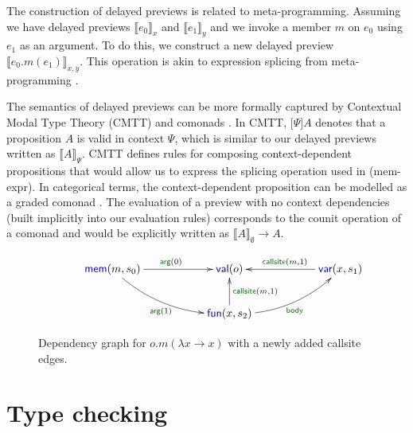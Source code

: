 \documentclass[english,crc]{programming}
\theoremstyle{plain}
\theoremstyle{definition}
\newcommand{\bnd}[1]{\textnormal{\textcolor{kvdclr}{\sffamily #1}}}
\newcommand{\blbl}[1]{\textnormal{\textcolor{numclr}{\sffamily #1}}}
\newcommand{\rname}[1]{{\sffamily(#1)}}
\begin{document}
The construction of delayed previews is related to meta-programming. Assuming
we have delayed previews $\llbracket e_0 \rrbracket_x$ and $\llbracket e_1 \rrbracket_y$ and
we invoke a member $m$ on $e_0$ using $e_1$ as an argument. To do this, we construct a new
delayed preview $\llbracket e_0.m(e_1) \rrbracket_{x, y}$. This operation is akin to expression
splicing from meta-programming \cite{metaml,quotations}.

The semantics of delayed previews can be more formally captured by Contextual Modal Type Theory
(CMTT) \cite{cmtt} and comonads \cite{cmtt-denotation}. In CMTT, $\lbrack \Psi \rbrack A$ denotes
that a proposition $A$ is valid in context $\Psi$, which is similar to our delayed previews written
as $\llbracket A \rrbracket_\Psi$. CMTT defines rules for composing context-dependent propositions
that would allow us to express the splicing operation used in \rname{mem-expr}. In categorical
terms, the context-dependent proposition can be modelled as a graded comonad \cite{effectrev,graded}.
The evaluation of a preview with no context dependencies (built implicitly into our evaluation rules)
corresponds to the counit operation of a comonad and would be explicitly written as
$\llbracket A \rrbracket_\emptyset \rightarrow A$.


\begin{figure}
\vspace{-0.5em}
\begin{equation*}
\hspace{3em}
\xymatrix{
\bnd{mem}(m, s_0) \ar@/_1pc/[drr]_{\blbl{arg}(1)} \ar[rr]^{\blbl{arg}(0)} && \bnd{val}(o) && \bnd{var}(x, s_1)\ar[ll]_{\blbl{callsite}(m, 1)} \\
&&\bnd{fun}(x, s_2) \ar[u]_{\blbl{callsite}(m, 1)} \ar@/_1pc/[rru]_{\blbl{body}} &&
}
\end{equation*}
\vspace{-0.5em}
\caption{Dependency graph for $o.m(\lambda x\rightarrow x)$ with a newly added \blbl{callsite} edges.}
\label{fig:graph-func}
\vspace{-0.5em}
\end{figure}


\section{Type checking}
\label{sec:extra-types}
\end{document}
